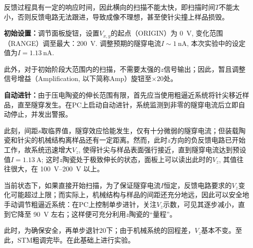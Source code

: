 \documentclass[aps,pre,12pt,preprint,%
	onecolumn,showpacs,showkeys,nofootinbib]{revtex4-1}
\begin{document}
	反馈过程具有一定的响应时间，因此横向的扫描不能太快，即扫描时间$T$不能太小，否则反馈电路无法跟进，导致成像不理想，甚至使针尖撞上样品损毁。
	
	\textbf{初始设置：}调节面板旋钮，设置$V_{x,y}$的起点（ORIGIN）为 \SI{0}{\volt}, 变化范围（RANGE）调至最大：\SI{200}{\volt}. 调整预期的隧穿电流$I \sim \SI{1}{\nA}$, 本次实验中的设定值为$I = \SI{1.13}{\nA}$. 
	
	此外，对于初始阶段大范围内的扫描，不需要太强的$z$信号输出；因此，暂且调整信号增益（Amplification, 以下简称Amp）旋钮至$\boxed{\times 20}$处。
	
	\textbf{自动进针：}由于压电陶瓷的伸长范围有限，首先应当使用粗逼近系统将针尖移近样品，直至隧穿发生。在PC上启动自动进针，系统监测到非零的隧穿电流后立即自动停止，并发出警报。
	
	此刻，间距$s$取临界值，隧穿效应恰能发生，仅有十分微弱的隧穿电流；但装载陶瓷和针尖的机械结构离样品还有一定距离。然而，此时$z$方向的负反馈电路已开始工作，故系统迅速增大$V_z$, 使得针尖与样品表面强行接近，直到隧穿电流达到预设值$I = \SI{1.13}{\A}$; 这时$z$陶瓷处于极致伸长的状态，面板上可以读出此时的$V_z$, 其值往往很大，在 \SIrange{100}{200}{\V} 以上。
	
	当前状态下，如果直接开始扫描，为了保证隧穿电流$I$恒定，反馈电路要求的$V_z$变化可能超过上限；而实际上，机械结构与样品的间距还充分地远，因此可以安全地手动调节粗逼近系统：在PC上控制单步进针，关注$V_z$示数，可见其逐步减小，直到它降至 \SI{90}{\V} 左右；这样便可充分利用$z$陶瓷的“量程”。
	
	此时，为确保安全，再单步退针20下；由于机械系统的回程差，$V_z$基本不变。至此，STM粗调完毕。在此基础上进行实验。
\end{document}

